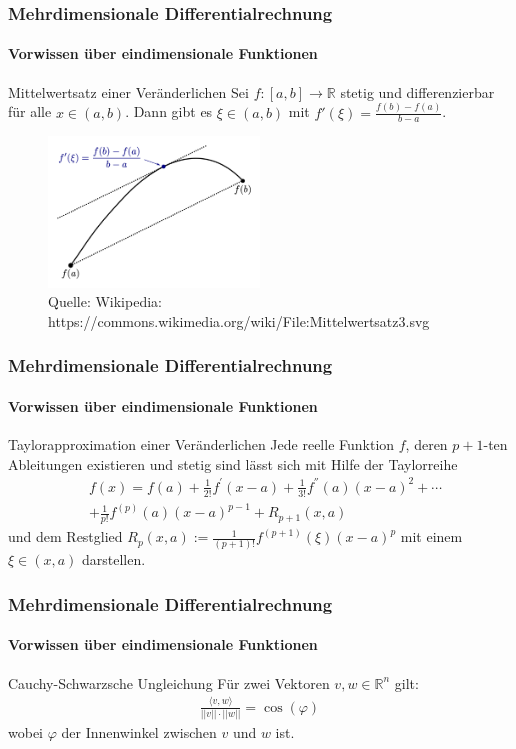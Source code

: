 \documentclass{beamer}
\begin{document}
\begin{frame}
    \frametitle{Mehrdimensionale Differentialrechnung}
\framesubtitle{Vorwissen über eindimensionale  Funktionen}
    \begin{block}{Mittelwertsatz einer Veränderlichen}
Sei $f : [a,b] \to \mathbb{R}$ stetig und differenzierbar für alle $x \in (a,b)$. Dann gibt es $\xi \in (a,b)$ mit
$f'(\xi) = \frac{f(b) - f(a)} { b-a}$.
\end{block}
\begin{figure}[H]
      \centering
    \includegraphics[width=0.5\textwidth]{images/Mittelwertsatz3.png}
      \caption{Quelle: Wikipedia: https://commons.wikimedia.org/wiki/File:Mittelwertsatz3.svg}
\end{figure}
 \end{frame}


\begin{frame}
    \frametitle{Mehrdimensionale Differentialrechnung}
\framesubtitle{Vorwissen über eindimensionale  Funktionen}
    \begin{block}{Taylorapproximation einer Veränderlichen}
Jede  reelle Funktion $f$, deren $p+1$-ten Ableitungen existieren und stetig sind lässt sich mit Hilfe der Taylorreihe  
\begin{align*}
&f(x) = f(a) + \frac{1}{2!} f^{'} (x-a) +   \frac{1}{3!} f^{''}(a) (x-a)^2 + \cdots  \\
& +  \frac{1}{p!} f^{(p)}(a) (x-a)^{p-1} +  R_{p+1}(x,a) 
\end{align*}
und dem Restglied  $R_p(x,a) :=   \frac{1}{(p+1)!} f^{(p+1)}(\xi) (x-a)^{p} $ mit einem $\xi \in (x,a)$ darstellen.
\end{block}

 \end{frame}

\begin{frame}
    \frametitle{Mehrdimensionale Differentialrechnung}
\framesubtitle{Vorwissen über eindimensionale  Funktionen}
    \begin{block}{Cauchy-Schwarzsche Ungleichung}
 Für zwei Vektoren $v,w \in \mathbb{R}^n$ gilt: 
\begin{align*}
\frac{\langle v, w \rangle}{||v|| \cdot ||w||} = \cos(\varphi) 
\end{align*}
wobei $\varphi$ der Innenwinkel zwischen $v$ und $w$ ist.
\end{block}

 \end{frame}
\end{document}
